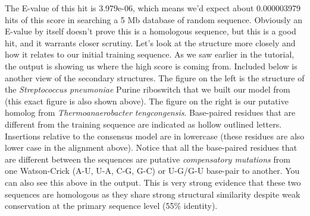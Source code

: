 The E-value of this hit is 3.979e-06, which means we'd expect about
0.000003979 hits of this score in searching a 5 Mb database of random
sequence. Obviously an E-value by itself doesn't prove this is a
homologous sequence, but this is a good hit, and it warrants closer
scrutiny. 
Let's look at the structure more closely and how it relates to our
initial training sequence.  As we saw earlier in the tutorial, the
 output is showing us where the high score is coming
from. Included below is another view of the secondary structures.  The
figure on the left is the structure of the \emph{Streptococcus
pneumoniae} Purine riboswitch that we built our model from (this exact
figure is also shown above).  The figure on the right is our putative
homolog from \emph{Thermoanaerobacter tengcongensis}.  Base-paired
residues that are different from the training sequence are indicated
as hollow outlined letters. Insertions relative to the consensus model
are in lowercase (these residues are also lower case in
the  alignment above). Notice that all the base-paired
residues that are different between the sequences are putative
\emph{compensatory mutations} from one Watson-Crick (A-U, U-A, C-G,
G-C) or U-G/G-U base-pair to another. You can also see this above in
the  output. This is very strong evidence that these
two sequences are homologous as they share strong structural
similarity despite weak conservation at the primary sequence level
(55\% identity).


